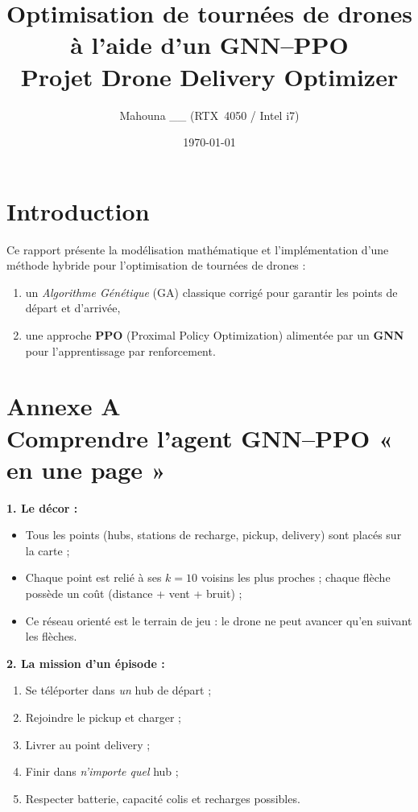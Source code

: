 \documentclass[11pt,a4paper]{article}
\title{\texorpdfstring{Optimisation de tournées de drones à l'aide d'un GNN--PPO\\\small Projet Drone Delivery Optimizer}{Optimisation de tournées de drones à l'aide d'un GNN-PPO - Projet Drone Delivery Optimizer}}
\author{\texorpdfstring{\small Mahouna \_\_ \quad (RTX~4050 / Intel i7)}{Mahouna __ (RTX 4050 / Intel i7)}}
\date{\today}
\begin{document}
\maketitle
\tableofcontents
\newpage

\section{Introduction}
Ce rapport présente la modélisation mathématique et l'implémentation d'une méthode hybride pour l'optimisation de tournées de drones : 
\begin{enumerate}
  \item un \emph{Algorithme Génétique} (GA) classique corrigé pour garantir les points de départ et d'arrivée,
  \item une approche \textbf{PPO} (Proximal Policy Optimization) alimentée par un \textbf{GNN} pour l'apprentissage par renforcement.
\end{enumerate}
\section*{Annexe A \\ Comprendre l'agent GNN--PPO « en une page »}

\textbf{1. Le décor :}  
\begin{itemize}\setlength\itemsep{2pt}
\item Tous les points (hubs, stations de recharge, pickup, delivery) sont placés sur la carte ;
\item Chaque point est relié à ses $k=10$ voisins les plus proches ; chaque flèche possède un coût (distance + vent + bruit) ;
\item Ce réseau orienté est le terrain de jeu : le drone ne peut avancer qu'en suivant les flèches.
\end{itemize}

\textbf{2. La mission d'un épisode :}
\begin{enumerate}\setlength\itemsep{2pt}
\item Se téléporter dans \emph{un} hub de départ ;
\item Rejoindre le pickup et charger ;
\item Livrer au point delivery ;
\item Finir dans \emph{n'importe quel} hub ;
\item Respecter batterie, capacité colis et recharges possibles.
\end{enumerate}
\end{document}
